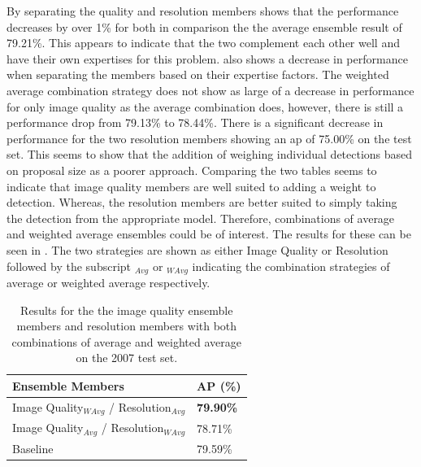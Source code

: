 By separating the quality and resolution members  shows that the performance decreases by over 1\% for both in comparison the the average ensemble result of 79.21\%. This appears to indicate that the two complement each other well and have their own expertises for this problem.  also shows a decrease in performance when separating the members based on their expertise factors. The weighted average combination strategy does not show as large of a decrease in performance for only image quality as the average combination does, however, there is still a performance drop from 79.13\% to 78.44\%. There is a significant decrease in performance for the two resolution members showing an \gls{ap} of 75.00\% on the test set. This seems to show that the addition of weighing individual detections based on proposal size as a poorer approach. Comparing the two tables seems to indicate that image quality members are well suited to adding a weight to detection. Whereas, the resolution members are better suited to simply taking the detection from the appropriate model. Therefore, combinations of average and weighted average ensembles could be of interest. The results for these can be seen in . The two strategies are shown as either Image Quality or Resolution followed by the subscript $_{Avg}$ or $_{WAvg}$ indicating the combination strategies of average or weighted average respectively. 

\begin{table}[h]
\centering
\caption{Results for the the image quality ensemble members and resolution members with both combinations of average and weighted average on the 2007 test set.}
\label{tab:weandavgres}
\begin{tabular}{|l|l|}
\hline
\textbf{Ensemble Members}                  & \textbf{AP (\%)} \\ \hline
Image Quality$_{WAvg}$ / Resolution$_{Avg}$ & \textbf{79.90\%} \\ \hline
Image Quality$_{Avg}$ / Resolution$_{WAvg}$ & 78.71\% \\ \hline
Baseline                          & 79.59\% \\ \hline
\end{tabular}
\end{table}

